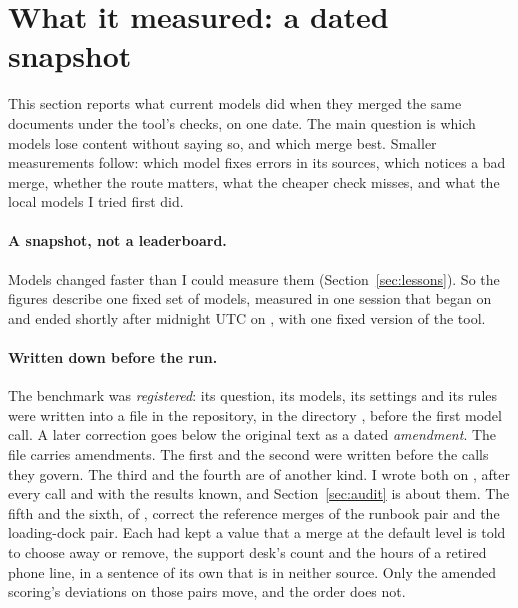 \section{What it measured: a dated snapshot}
\label{sec:findings}

This section reports what current models did when they merged the same documents under the tool's checks, on one date. The main question is which models lose content without saying so, and which merge best. Smaller measurements follow: which model fixes errors in its sources, which notices a bad merge, whether the route matters, what the cheaper check misses, and what the local models I tried first did.

\paragraph{A snapshot, not a leaderboard.} Models changed faster than I could measure them (Section~\ref{sec:lessons}). So the figures describe one fixed set of models, measured in one session that began on  and ended shortly after midnight UTC on , with one fixed version of the tool.

\paragraph{Written down before the run.} The benchmark was \emph{registered}: its question, its models, its settings and its rules were written into a file in the repository, in the directory \texttt{}, before the first model call. A later correction goes below the original text as a dated \emph{amendment}. The file carries  amendments. The first and the second were written before the calls they govern. The third and the fourth are of another kind. I wrote both on , after every call and with the results known, and Section~\ref{sec:audit} is about them. The fifth and the sixth, of , correct the reference merges of the runbook pair and the loading-dock pair. Each had kept a value that a merge at the default level is told to choose away or remove, the support desk's count and the hours of a retired phone line, in a sentence of its own that is in neither source. Only the amended scoring's deviations on those pairs move, and the order does not.


